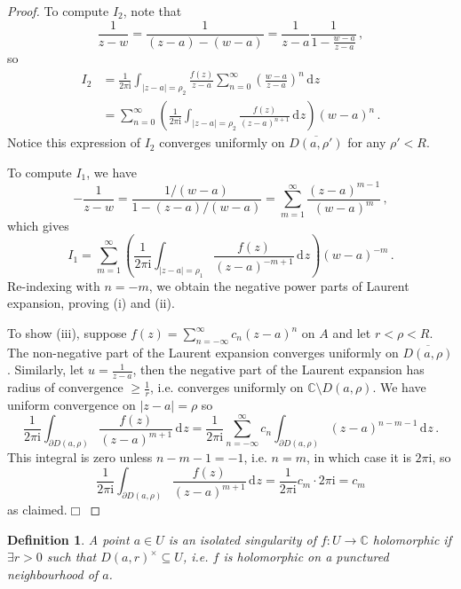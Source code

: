 \documentclass{article}
\theoremstyle{plain}\theoremheaderfont{\normalfont\itshape}\theorembodyfont{\rmfamily}\theoremseparator{.}\newtheorem*{rem}{Remark}\newtheorem*{ex}{Example}\newtheorem*{proof}{Proof}\newtheorem*{altp}{Alternative proof}\newtheorem*{con}{Consequences}\newtheorem*{notn}{Notations}\newtheorem*{cau}{Caution}\newtheorem*{term}{Terminology}\newtheorem*{keyex}{Key example}
\theoremstyle{plain}\theoremheaderfont{\normalfont\bfseries}\theorembodyfont{\rmfamily}\theoremseparator{.}\newtheorem{thm}{Theorem}[section]\newtheorem{lem}[thm]{Lemma}\newtheorem{prop}[thm]{Proposition}\newtheorem*{cor}{Corollary}\newtheorem{defn}[thm]{Definition}\newtheorem{clm}[thm]{Claim}\newtheorem{clminproof}{Claim}\newtheorem{leminproof}{Lemma}\newtheorem{app}{Application}
\theoremstyle{break}\theoremheaderfont{\normalfont\itshape}\theorembodyfont{\rmfamily}\theoremseparator{.\medskip}\newtheorem*{proofskip}{Proof}\newtheorem*{exs}{Examples}\newtheorem*{rems}{Remarks}\newtheorem*{rec}{Recall}\newtheorem*{ppts}{Properties}
\theoremstyle{break}\theoremheaderfont{\normalfont\bfseries}\theorembodyfont{\rmfamily}\theoremseparator{.\medskip}\newtheorem{lemskip}[thm]{Lemma}\newtheorem{defnskip}[thm]{Definition}\newtheorem{propskip}[thm]{Proposition}\newtheorem{thmskip}[thm]{Theorem}
\numberwithin{equation}{section}
\newcommand{\ii}{\mathrm{i}}
\newcommand{\qed}{\hfill\ensuremath{\Box}}
\newcommand{\abs}[1]{\left|#1\right|}
\newcommand{\dd}[2][]{\,\mathrm{d}^{#1} #2}
\newcommand{\CC}{\mathbb{C}}
\begin{document}
\begin{proof}
        To compute \(I_2\), note that
        \[\frac{1}{z-w}=\frac{1}{(z-a)-(w-a)}=\frac{1}{z-a}\frac{1}{1-\frac{w-a}{z-a}}\,,\]
        so
        \begin{align*}
            I_2&=\frac{1}{2\pi \ii}\int_{\abs{z-a}=\rho_2}\frac{f(z)}{z-a}\sum_{n=0}^{\infty}\left(\frac{w-a}{z-a}\right)^n\dd{z}\\
            &=\sum_{n=0}^{\infty}\left(\frac{1}{2\pi \ii}\int_{\abs{z-a}=\rho_2}\frac{f(z)}{(z-a)^{n+1}}\dd{z}\right)(w-a)^n\,.
        \end{align*}
        Notice this expression of \(I_2\) converges uniformly on \(\overline{D(a,\rho')}\) for any \(\rho'< R\).

        To compute \(I_1\), we have
        \[-\frac{1}{z-w}=\frac{1/(w-a)}{1-(z-a)/(w-a)}=\sum_{m=1}^{\infty}\frac{(z-a)^{m-1}}{(w-a)^m}\,,\]
        which gives
        \[I_1=\sum_{m=1}^{\infty}\left(\frac{1}{2\pi \ii}\int_{\abs{z-a}=\rho_1}\frac{f(z)}{(z-a)^{-m+1}}\dd{z}\right)(w-a)^{-m}\,.\]
        Re-indexing with \(n=-m\), we obtain the negative power parts of Laurent expansion, proving (i) and (ii).

        To show (iii), suppose \(f(z)=\sum_{n=-\infty}^{\infty}c_n(z-a)^n\) on \(A\) and let \(r<\rho<R\). The non-negative part of the Laurent expansion converges uniformly on \(\overline{D(a,\rho)}\). Similarly, let \(u=\frac{1}{z-a}\), then the negative part of the Laurent expansion has radius of convergence \(\ge\frac{1}{r}\), i.e. converges uniformly on \(\CC\setminus D(a,\rho)\). We have uniform convergence on \(\abs{z-a}=\rho\) so
        \[\frac{1}{2\pi \ii}\int_{\partial D(a,\rho)}\frac{f(z)}{(z-a)^{m+1}}\dd{z}=\frac{1}{2\pi \ii}\sum_{n=-\infty}^{\infty}c_n\int_{\partial D(a,\rho)}(z-a)^{n-m-1}\dd{z}\,.\]
        This integral is zero unless \(n-m-1=-1\), i.e. \(n=m\), in which case it is \(2\pi \ii\), so
        \[\frac{1}{2\pi \ii}\int_{\partial D(a,\rho)}\frac{f(z)}{(z-a)^{m+1}}\dd{z}=\frac{1}{2\pi \ii}c_m\cdot 2\pi \ii=c_m\]
        as claimed.\qed
    \end{proof}
    \begin{defn}
        A point \(a\in U\) is an \textit{isolated singularity} of \(f:U\to \CC\) holomorphic if \(\exists r>0\) such that \(D(a,r)^\times\subseteq U\), i.e. \(f\) is holomorphic on a punctured neighbourhood of \(a\).
    \end{defn}
\end{document}

